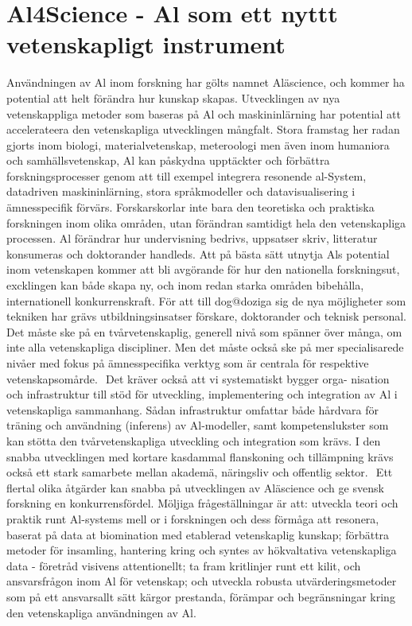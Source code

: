 {{{{{{{{\section*{Al4Science - Al som ett nyttt vetenskapligt instrument}
Användningen av Al inom forskning har gölts namnet Aläscience, och kommer ha potential att helt förändra hur kunskap skapas. Utvecklingen av nya vetenskappliga metoder som baseras på Al och maskininlärning har potential att accelerateera den vetenskapliga utvecklingen mångfalt. Stora framstag her radan gjorts inom biologi, materialvetenskap, meteroologi men även inom humaniora och samhällsvetenskap, Al kan påskydna upptäckter och förbättra forskningsprocesser genom att till exempel integrera resonende al-System, datadriven maskininlärning, stora språkmodeller och datavisualisering i ämnesspecifik förvärs.
Forskarskorlar inte bara den teoretiska och praktiska forskningen inom olika områden, utan förändran samtidigt hela den vetenskapliga processen. Al förändrar hur undervisning bedrivs, uppsatser skriv, litteratur konsumeras och doktorander handleds. Att på bästa sätt utnytja Als potential inom vetenskapen kommer att bli avgörande för hur den nationella forskningsut, excklingen kan både skapa ny, och inom redan starka områden bibehålla, internationell konkurrenskraft. För att till dog@doziga sig de nya möjligheter som tekniken har grävs utbildningsinsatser förskare, doktorander och teknisk personal. Det måste ske på en tvårvetenskaplig, generell nivå som spänner över många, om inte alla vetenskapliga discipliner. Men det
måste också ske på mer specialisarede nivåer med fokus på ämnesspecifika verktyg som är centrala för respektive vetenskapsomårde. \({ }^{}\)
Det kräver också att vi systematiskt bygger orga- nisation och infrastruktur till stöd för utveckling, implementering och integration av Al i vetenskapliga sammanhang. Sådan infrastruktur omfattar både hårdvara för träning och användning (inferens) av Al-modeller, samt kompetenslukster som kan stötta den tvårvetenskapliga utveckling och integration som krävs. I den snabba utvecklingen med kortare kasdammal flanskoning och tillämpning krävs också ett stark samarbete mellan akademä, näringsliv och offentlig sektor. \({ }^{}\)
Ett flertal olika åtgärder kan snabba på utvecklingen av Aläscience och ge svensk forskning en konkurrensfördel. Möljiga frågeställningar är att: utveckla teori och praktik runt Al-systems mell or i forskningen och dess förmåga att resonera, baserat på data at biomination med etablerad vetenskaplig kunskap; förbättra metoder för insamling, hantering kring och syntes av hökvaltativa vetenskapliga data - företråd visivens attentionellt; ta fram kritlinjer runt ett kilit, och ansvarsfrågon inom Al för vetenskap; och utveckla robusta utvärderingsmetoder som på ett ansvarsallt sätt kärgor prestanda, förämpar och begränsningar kring den vetenskapliga användningen av Al.

}}}}}}}}
